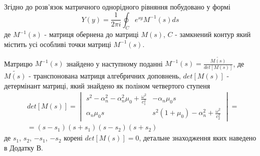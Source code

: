 Згідно до \cite{popov_5} розв'язок матричного однорідного рівняння побудовано у формі
\begin{equation}
    Y(y) = \frac{1}{2\pi i} \oint_C e^{sy} M^{-1}(s)ds
\end{equation}
де $M^{-1}(s)$ - матриця обернена до матриці $M(s)$, $C$ - замкнений контур який містить усі особливі точки матриці $M^{-1}(s)$.

Матрицю $M^{-1}(s)$ знайдено у наступному поданні $M^{-1}(s) = \frac{\widetilde{M(s)}}{det[M(s)]}$, де $\widetilde{M(s)}$ - транспонована матриця алгебричних доповнень,
$det[M(s)]$ - детермінант матриці, який знайдено як поліном четвертого ступеня
\begin{align}
    &det[M(s)] = \begin{vmatrix}
        s^2 - \alpha_n^2 - \alpha_n^2\mu_0 + \frac{\omega^2}{c_1^2} & -\alpha_n \mu_0 s \\
        \alpha_n \mu_0 s & s^2 (1 + \mu_0) -\alpha_n^2 + \frac{\omega^2}{c_2^2}
     \end{vmatrix} = \nonumber \\
    &=(s - s_1)(s + s_1)(s - s_2)(s + s_2)
\end{align}
де $s_1$, $s_2$, $-s_1$, $-s_2$ корені $det[M(s)]=0$, детальне знаходження яких наведено в Додатку В.

